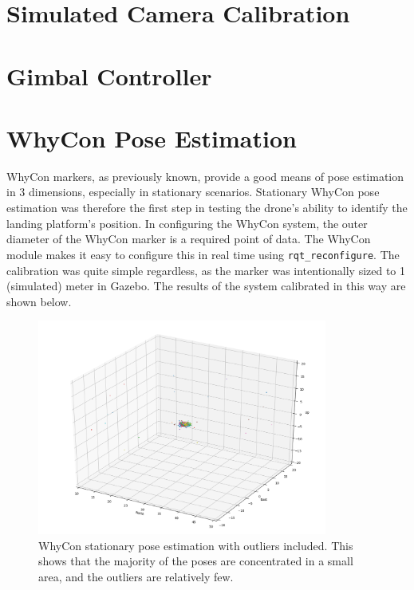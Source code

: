 \section{Simulated Camera Calibration}



\section{Gimbal Controller}


\section{WhyCon Pose Estimation}


WhyCon markers, as previously known, provide a good means of pose estimation in 3 dimensions, especially in stationary scenarios. Stationary WhyCon pose estimation was therefore the first step in testing the drone's ability to identify the landing platform's position. In configuring the WhyCon system, the outer diameter of the WhyCon marker is a required point of data. The WhyCon module makes it easy to configure this in real time using \texttt{rqt\_reconfigure}. The calibration was quite simple regardless, as the marker was intentionally sized to 1 (simulated) meter in Gazebo. The results of the system calibrated in this way are shown below.

\begin{figure}[ht]
    \centering
    \includegraphics[width=0.85\textwidth]{images/whycon_pose_estimation_with_outliers.png}
    \caption[WhyCon stationary pose estimation with outliers included.]{WhyCon stationary pose estimation with outliers included. This shows that the majority of the poses are concentrated in a small area, and the outliers are relatively few.}
    \label{fig:whycon_stationary_pose_estimation_with_outliers}
\end{figure}

